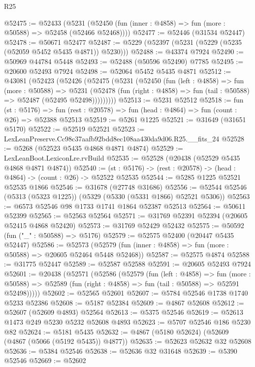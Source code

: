 \begin{lexlean}{R25}
\begin{coremodule}
@52475 := @52433
    (@5231 (@52450 (fun (inner : @4858) => fun (more : @50588) => @52458 (@52466 @52468))))
@52477 := @52446 (@31534 @52447)
@52478 := @50671 @52477
@52487 := @5229 (@52397 (@5231 (@5229 (@5235 (@52059 @5452 @5435 @4871)) @5230)))
@52488 := @43374 @7924
@52490 := @50969 @44784 @5448
@52493 := @52488 (@50596 @52490) @7785
@52495 := @20600 @52493 @7924
@52498 := @52064 @5452 @5435 @4871
@52512 := @43081
    (@52423
      (@52426
        (@52475
          (@5231
            (@52450
              (fun (left : @4858) =>
              fun (more : @50588) =>
              @5231
                (@52478
                  (fun (right : @4858) => fun (tail : @50588) => @52487 (@52495 @52498)))))))))
@52513 := @5231 @52512
@52518 := fun (st : @5176) =>
  fun (rest : @20578) => fun (head : @4864) => fun (count : @26) => @52388 @52513
@52519 := @5261 @1225
@52521 := @31649 (@31651 @5170)
@52522 := @52519 @52521
@52523 := LexLeanPreserve.Cc98c37aafb92bdd8ec108aa430da9d06.R25.__fits_24
@52528 := @5268 (@52523 @5435 @4868 @4871 @4874)
@52529 := LexLeanBoot.LexiconLre.rvBuild
@52535 := @52528 (@20438 (@52529 @5435 @4868 @4871 @4874))
@52540 := (st : @5176) -> (rest : @20578) -> (head : @4864) -> (count : @26) -> @52522 @52535
@52544 := @5285 @1225 @52521 @52535 @1866
@52546 := @31678 (@27748 @31686)
@52556 := @52544 @52546 (@5313 (@5323 @1225)) (@5329 (@5330 (@5331 @1866) @52521 @5306))
@52563 := @6573 @52546 @98 @1733 @1741 @1864 @52387 @52513
@52564 := @50611 @52399
@52565 := @52563 @52564
@52571 := @31769 @52391 @52394 (@20605 @52415 @4868 @52420)
@52573 := @31769 @52429 @52432
@52575 := @50592 (fun ("_" : @50588) => @5176)
@52579 := @52575 @52400 (@20447 @5435 @52447)
@52586 := @52573 (@52579 (fun (inner : @4858) => fun (more : @50588) => @20605 @52464 @5448 @52468))
@52587 := @52575 @4874
@52588 := @31775 @52447
@52589 := @52587 @52588
@52591 := @20605 @52493 @7924
@52601 := @20438
    (@52571
      (@52586
        (@52579
          (fun (left : @4858) =>
          fun (more : @50588) =>
          @52589 (fun (right : @4858) => fun (tail : @50588) => @52591 @52498)))))
@52602 := @52565 @52601
@52607 := @5784 @52546 @1738 @1740 @5233 @52386
@52608 := @5187 @52384
@52609 := @4867 @52608
@52612 := @52607 (@52609 @4893) @52564
@52613 := @5375 @52546
@52619 := @52613 @1473 @249 @5230 @5232 @52608 @4893
@52623 := @5707 @52546 @186 @5230 @82
@52624 := @5181 @5435
@52632 := @4867 (@5180 @52624) (@52609 (@4867 (@5066 (@5192 @5435)) @4877))
@52635 := @52623 @52632 @32 @52608
@52636 := @5384 @52546
@52638 := @52636 @32 @31648
@52639 := @5390 @52546
@52669 := @52602

\end{coremodule}
\end{lexlean}
